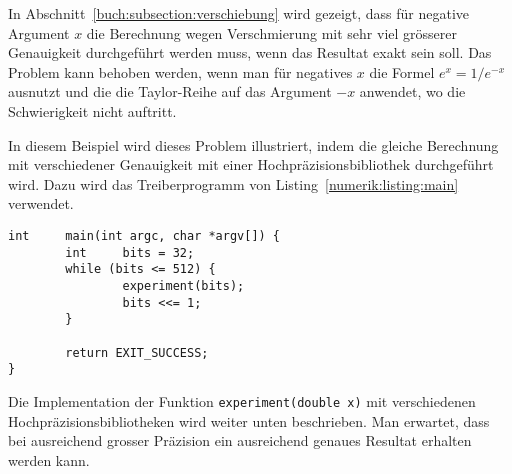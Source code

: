 In Abschnitt~\ref{buch:subsection:verschiebung} wird gezeigt, dass
für negative Argument $x$ die Berechnung wegen Verschmierung mit sehr
viel grösserer Genauigkeit durchgeführt werden muss, wenn das Resultat
exakt sein soll.
Das Problem kann behoben werden, wenn man für negatives $x$
die Formel $e^x = 1/e^{-x}$ ausnutzt und die die Taylor-Reihe
auf das Argument $-x$ anwendet, wo die Schwierigkeit nicht auftritt.

In diesem Beispiel wird dieses Problem illustriert, indem die gleiche
Berechnung mit verschiedener Genauigkeit mit einer Hochpräzisionsbibliothek
durchgeführt wird.
Dazu wird das Treiberprogramm von Listing~\ref{numerik:listing:main}
verwendet.
\begin{lstlisting}[float,style=C,caption={Treiber-Programm zur Berechnung von $e^x$ mit verschiedenen Hochpräzisionsbibliotheken.},label={numerik:listing:main}]
int     main(int argc, char *argv[]) {
        int     bits = 32;
        while (bits <= 512) {
                experiment(bits);
                bits <<= 1;
        }

        return EXIT_SUCCESS;
}
\end{lstlisting}
Die Implementation der Funktion \texttt{experiment(double x)} mit 
verschiedenen Hochpräzisionsbibliotheken wird weiter unten beschrieben.
Man erwartet, dass bei ausreichend grosser Präzision ein ausreichend
genaues Resultat erhalten werden kann.

